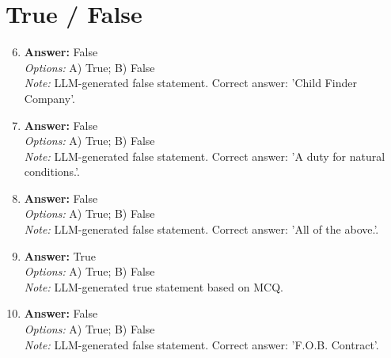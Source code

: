 \documentclass[12pt]{article}
\begin{document}
\section*{True / False}
\begin{enumerate}[label=\arabic*.]
\setcounter{enumi}{5}
\item \textbf{Answer:} False
\\ \textit{Options:} A) True; B) False
\\ \textit{Note:} LLM-generated false statement. Correct answer: 'Child Finder Company'.
\item \textbf{Answer:} False
\\ \textit{Options:} A) True; B) False
\\ \textit{Note:} LLM-generated false statement. Correct answer: 'A duty for natural conditions.'.
\item \textbf{Answer:} False
\\ \textit{Options:} A) True; B) False
\\ \textit{Note:} LLM-generated false statement. Correct answer: 'All of the above.'.
\item \textbf{Answer:} True
\\ \textit{Options:} A) True; B) False
\\ \textit{Note:} LLM-generated true statement based on MCQ.
\item \textbf{Answer:} False
\\ \textit{Options:} A) True; B) False
\\ \textit{Note:} LLM-generated false statement. Correct answer: 'F.O.B. Contract'.
\end{enumerate}
\end{document}
